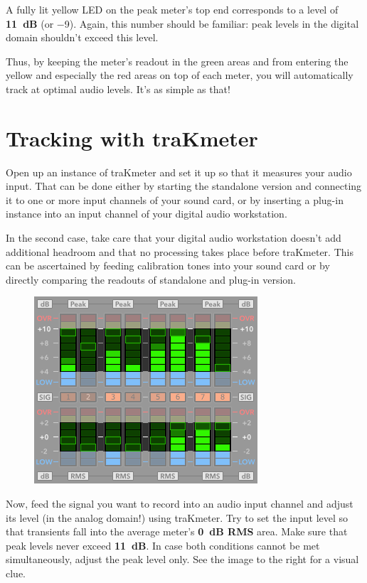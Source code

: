 A fully lit yellow LED on the peak meter's top end corresponds to a
level of \textbf{\SI[addsign=all]{+11}{\dB}} (or \SI{-9}{\dBFS}).
Again, this number should be familiar: peak levels in the digital
domain shouldn't exceed this level.

Thus, by keeping the meter's readout in the green areas and from
entering the yellow and especially the red areas on top of each meter,
you will automatically track at optimal audio levels.  It's as simple
as that!

\section{Tracking with traKmeter}
\label{sec:tracking_with_trakmeter}

Open up an instance of traKmeter and set it up so that it measures
your audio input.  That can be done either by starting the standalone
version and connecting it to one or more input channels of your sound
card, or by inserting a plug-in instance into an input channel of your
digital audio workstation.

In the second case, take care that your digital audio workstation
doesn't add additional headroom and that no processing takes place
before traKmeter.  This can be ascertained by feeding calibration
tones into your sound card or by directly comparing the readouts of
standalone and plug-in version.

\begin{figure}
\includegraphics[scale=0.45,clip]{include/images/trakmeter_optimal.png}
\end{figure}

Now, feed the signal you want to record into an audio input channel
and adjust its level (in the analog domain!) using traKmeter.  Try to
set the input level so that transients fall into the average meter's
\textbf{\SI{0}{\dB} RMS} area.  Make sure that peak levels never
exceed \textbf{\SI[addsign=all]{+11}{\dB}}.  In case both conditions
cannot be met simultaneously, adjust the peak level only.  See the
image to the right for a visual clue.

